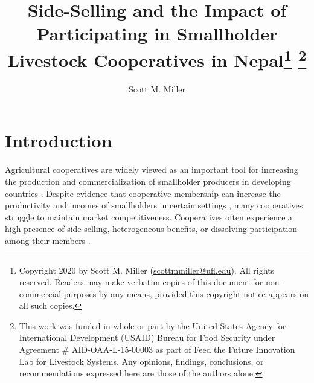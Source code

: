 \documentclass[11pt]{article}
\begin{document}



\title{Side-Selling and the Impact of Participating in Smallholder Livestock Cooperatives in Nepal\thanks{Copyright 2020 by Scott M. Miller (\href{scottmmiller@ufl.edu}{scottmmiller@ufl.edu}). All rights reserved. Readers may make verbatim copies of this document for non-commercial purposes by any means, provided this copyright notice appears on all such copies.} \thanks{This work was funded in whole or part by the United States Agency for International Development (USAID) Bureau for Food Security under Agreement # AID-OAA-L-15-00003 as part of Feed the Future Innovation Lab for Livestock Systems. Any opinions, findings, conclusions, or recommendations expressed here are those of the authors alone.}}

\author{Scott M. Miller}
\date{}

\sloppy
\maketitle



\vspace{2cm}


\clearpage
\doublespacing
\thispagestyle{plain}
\setcounter{page}{1}

\section{Introduction} \label{sec:intro}
Agricultural cooperatives are widely viewed as an important tool for increasing the production and commercialization of smallholder producers in developing countries \citep{poole_review_2010}. Despite evidence that cooperative membership can increase the productivity and incomes of smallholders in certain settings \citep{bernard_impact_2008,fischer_linking_2012,ma_does_2016}, many cooperatives struggle to maintain market competitiveness. Cooperatives often experience a high presence of side-selling, heterogeneous benefits, or dissolving participation among their members \citep{aflagah_cheap_2019,bernard_reaching_2009,casaburi_loyalty_2015}. 
\end{document}
